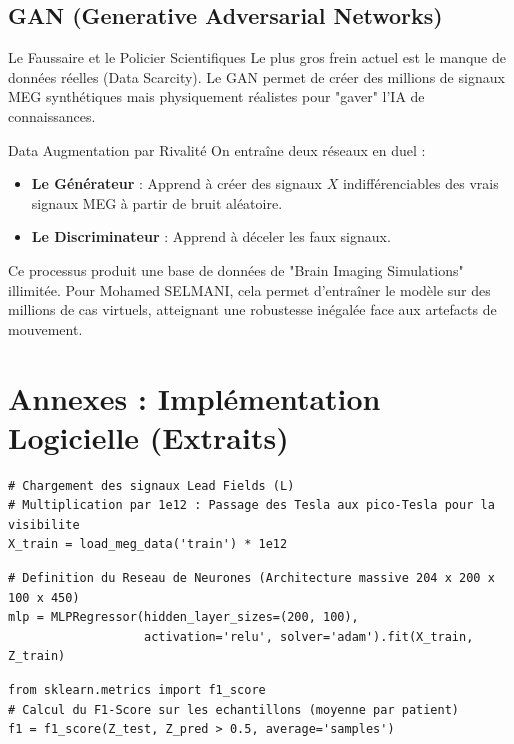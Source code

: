 \documentclass[a4paper,11pt]{article}
\begin{document}
\subsection{GAN (Generative Adversarial Networks)}
\begin{intuitionbox}{Le Faussaire et le Policier Scientifiques}
    Le plus gros frein actuel est le manque de données réelles (Data Scarcity). Le GAN permet de créer des millions de signaux MEG synthétiques mais physiquement réalistes pour "gaver" l'IA de connaissances.
\end{intuitionbox}
\begin{techbox}{Data Augmentation par Rivalité}
    On entraîne deux réseaux en duel :
    \begin{itemize}
        \item \textbf{Le Générateur} : Apprend à créer des signaux \(X\) indifférenciables des vrais signaux MEG à partir de bruit aléatoire.
        \item \textbf{Le Discriminateur} : Apprend à déceler les faux signaux. 
    \end{itemize}
    Ce processus produit une base de données de "Brain Imaging Simulations" illimitée. Pour Mohamed SELMANI, cela permet d'entraîner le modèle sur des millions de cas virtuels, atteignant une robustesse inégalée face aux artefacts de mouvement.
\end{techbox}

\newpage
\appendix
\section{Annexes : Implémentation Logicielle (Extraits)}
\begin{lstlisting}[caption=Détail du Scaling et Chargement]
# Chargement des signaux Lead Fields (L)
# Multiplication par 1e12 : Passage des Tesla aux pico-Tesla pour la visibilite
X_train = load_meg_data('train') * 1e12
\end{lstlisting}

\begin{lstlisting}[caption=Détail de la Modélisation MLP Profonde]
# Definition du Reseau de Neurones (Architecture massive 204 x 200 x 100 x 450)
mlp = MLPRegressor(hidden_layer_sizes=(200, 100), 
                   activation='relu', solver='adam').fit(X_train, Z_train)
\end{lstlisting}

\begin{lstlisting}[caption=Détail du Calcul de Performance F1]
from sklearn.metrics import f1_score
# Calcul du F1-Score sur les echantillons (moyenne par patient)
f1 = f1_score(Z_test, Z_pred > 0.5, average='samples')
\end{lstlisting}
\end{document}
